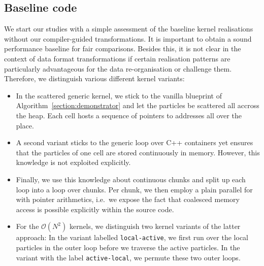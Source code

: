 \subsection{Baseline code}

%
%
We start our studies with a simple assessment of the baseline kernel realisations without our compiler-guided transformations.
It is important to obtain a sound performance baseline for fair comparisons.
Besides this, it is not clear in the context of data format transformations if certain realisation patterns are particularly advantageous for the data re-organisation or challenge them.
Therefore, we distinguish various different kernel variants:
\begin{itemize}
  \item In the scattered generic kernel, we stick to the vanilla blueprint of Algorithm~\ref{section:demonstrator} and let the particles be scattered all accross the heap. Each cell hosts a sequence of pointers to addresses all over the place.
  \item A second variant sticks to the generic loop over C++ containers yet ensures that the particles of one cell are stored continuously in memory. However, this knowledge is not exploited explicitly.
  \item Finally, we use this knowledge about continuous chunks and split up each loop into a loop over chunks. Per chunk, we then employ a plain parallel for with pointer arithmetics, i.e.~we expose the fact that coalesced memory access is possible explicitly within the source code.
  \item For the $\mathcal{O}(N^2)$ kernels, we distinguish two kernel variants of the latter approach: In the variant labelled \texttt{local-active}, we first run over the local particles in the outer loop before we traverse the active particles. In the variant with the label \texttt{active-local}, we permute these two outer loops.
\end{itemize}




